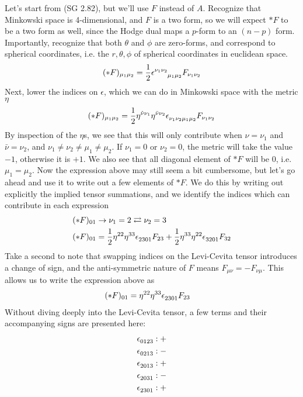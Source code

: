 Let's start from (SG 2.82), but we'll use $F$ instead of $A$. Recognize that Minkowski space is 4-dimensional, and $F$ is a two form, so we will expect $\ast F$ to be a two form as well, since the Hodge dual maps a $p$-form to an $(n-p)$ form. Importantly, recognize that both $\theta$ and $\phi$ are zero-forms, and correspond to spherical coordinates, i.e. the $r, \theta, \phi$ of spherical coordinates in euclidean space. 
%
\begin{align}
	(\ast F)_{\mu_1 \mu_2} = \frac{1}{2} \epsilon\indices{^{{\nu_1}{\nu_2}}_{{\mu_1}{\mu_2}}} F_{\nu_1 \nu_2}
\end{align} 
%
Next, lower the indices on $\epsilon$, which we can do in Minkowski space with the metric $\eta$
%
\begin{align}
	(\ast F)_{\mu_1 \mu_2} = \frac{1}{2} \eta\indices{^{\hat{\nu}\nu_1}}  \eta\indices{^{\bar{\nu}\nu_2}} \epsilon\indices{_{{\nu_1}{\nu_2}{\mu_1}{\mu_2}}} F_{\nu_1 \nu_2}
\end{align} 
%
By inspection of the $\eta$s, we see that this will only contribute when $\hat{\nu} = \nu_1$ and $\bar{\nu} = \nu_2$, and $\nu_1 \neq \nu_2 \neq \mu_1 \neq \mu_2$. If $\nu_1=0$ or $\nu_2=0$, the metric will take the value $-1$, otherwise it is $+1$. We also see that all diagonal element of $\ast F$ will be $0$, i.e. $\mu_1 = \mu_2$. Now the expression above may still seem a bit cumbersome, but let's go ahead and use it to write out a few elements of $\ast F$. We do this by writing out explicitly the implied tensor summations, and we identify the indices which can contribute in each expression
%
\begin{align}
	&(\ast F)_{0 1} \rightarrow \nu_1 = 2 \rightleftarrows \nu_2 = 3 \\
	&(\ast F)_{0 1} = \frac{1}{2} \eta\indices{^{22}}  \eta\indices{^{33}} \epsilon\indices{_{2301}} F_{23} + \frac{1}{2} \eta\indices{^{33}}  \eta\indices{^{22}} \epsilon\indices{_{3201}} F_{32}
\end{align}
%
Take a second to note that swapping indices on the Levi-Cevita tensor introduces a change of sign, and the anti-symmetric nature of $F$ means $F_{\mu\nu} = - F_{\nu\mu}$. This allows us to write the expression above as
%
\begin{align} \label{star_f_simple}
	&(\ast F)_{0 1} = \eta\indices{^{22}}  \eta\indices{^{33}} \epsilon\indices{_{2301}} F_{23}
\end{align}
%
Without diving deeply into the Levi-Cevita tensor, a few terms and their accompanying signs are presented here: 
%
\begin{align}
\epsilon\indices{_{0123}}: + \notag \\
\epsilon\indices{_{0213}}: - \notag \\
\epsilon\indices{_{2013}}: + \notag \\
\epsilon\indices{_{2031}}: - \notag \\
\epsilon\indices{_{2301}}: +
\end{align}
